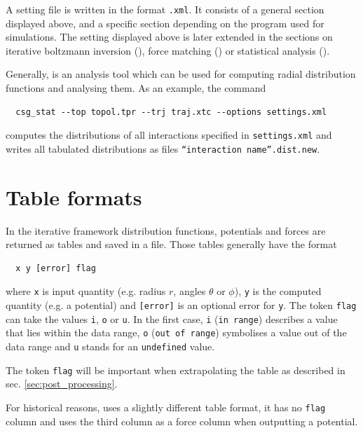 A setting file is written in the format \texttt{.xml}. It consists of a general section displayed above, and a specific section depending on the program used for simulations. The setting displayed above is later extended in the sections on iterative boltzmann inversion (), force matching () or statistical analysis ().

Generally,  is an analysis tool which can be used for computing radial distribution functions and analysing them. As an example, the command

\begin{verbatim}
  csg_stat --top topol.tpr --trj traj.xtc --options settings.xml
\end{verbatim}

computes the distributions of all interactions specified in \texttt{settings.xml} and writes all tabulated distributions as files \texttt{``interaction name''.dist.new}.

\section{Table formats}
\label{sec:table_formats}
In the iterative framework distribution functions, potentials and forces are returned as tables and saved in a file. Those tables generally have the format
\begin{verbatim}
  x y [error] flag
\end{verbatim}
where \texttt{x} is input quantity (e.g. radius $r$, angles $\theta$ or $\phi$), \texttt{y} is the computed quantity (e.g. a potential) and \texttt{[error]} is an optional error for \texttt{y}. The token \texttt{flag} can take the values \texttt{i}, \texttt{o} or \texttt{u}.
In the first case, \texttt{i} (\texttt{in range}) describes a value that lies within the data range, \texttt{o} (\texttt{out of range}) symbolises a value out of the data range and \texttt{u} stands for an \texttt{undefined} value.

The token \texttt{flag} will be important when extrapolating the table as described in sec. \ref{sec:post_processing}.

For historical reasons,  uses a slightly different table format, it has no \texttt{flag} column and uses the third column as a force column when outputting a potential.

